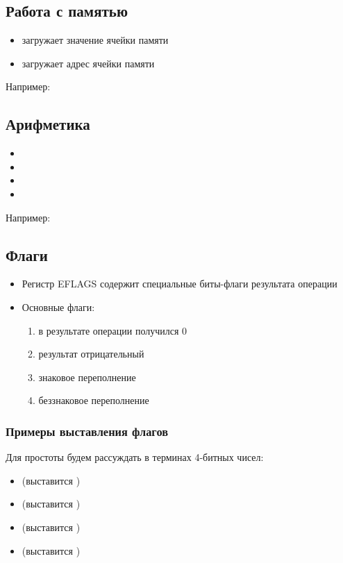   \subsection{Работа с памятью}
    \begin{itemize}
      \item {} загружает значение ячейки памяти
      \item {} загружает адрес ячейки памяти
    \end{itemize}
    Например: 
  
  \subsection{Арифметика}
    \begin{itemize}
      \item {}
      \item {}
      \item {}
      \item {}
    \end{itemize}
    
    Например: 

  \subsection{Флаги}
    \begin{itemize}
      \item Регистр EFLAGS содержит специальные биты-флаги результата операции
      \item Основные флаги:
      \begin{enumerate}
        \item {} в результате операции получился 0
        \item {} результат отрицательный
        \item {} знаковое переполнение
        \item {} беззнаковое переполнение
      \end{enumerate}
    \end{itemize}
  
  \subsubsection{Примеры выставления флагов}
    Для простоты будем рассуждать в терминах 4-битных чисел:
    \begin{itemize}
      \item {} (выставится )
      \item {} (выставится )
      \item {} (выставится )
      \item {} (выставится )
    \end{itemize}
    
